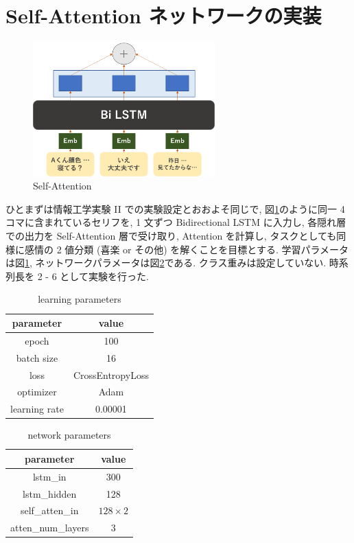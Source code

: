 \documentclass[twocolumn]{jarticle}     %
\begin{document}
\section{Self-Attention ネットワークの実装}

\begin{figure}[htb]
  \begin{center} %
    \includegraphics[width=7.0cm]{fig.png}
    \caption{Self-Attention} %
    \label{fig:sa} %
  \end{center}
\end{figure}

ひとまずは情報工学実験 II での実験設定とおおよそ同じで, 図\ref{fig:sa}のように同一 4 コマに含まれているセリフを, 1 文ずつ
Bidirectional LSTM に入力し, 各隠れ層での出力を Self-Attention 層で受け取り, Attention を計算し, タスクとしても同様に感情の 2 値分類 (喜楽 or その他) を解くことを目標とする. 学習パラメータは図\ref{tab:s-A}, ネットワークパラメータは図\ref{tab:net}である. クラス重みは設定していない. 時系列長を 2 - 6 として実験を行った.

\begin{table}[htb]
\begin{center}
\caption{learning parameters}
\begin{tabular}{|c|c|}
\hline
parameter & value \\ \hline
epoch & 100   \\
batch size    & 16    \\
loss & CrossEntropyLoss     \\
optimizer  & Adam     \\
learning rate     & 0.00001  \\ \hline
\end{tabular}
\label{tab:s-A}
\end{center}
\end{table}

\begin{table}[tbh]
\begin{center}
\caption{network parameters}
\begin{tabular}{|c|c|}
\hline
parameter & value \\ \hline
lstm\_in & 300   \\
lstm\_hidden    & 128    \\
self\_atten\_in & $128 \times 2$     \\
atten\_num\_layers & 3     \\ \hline
\end{tabular}
\label{tab:net}
\end{center}
\end{table}
\end{document}
